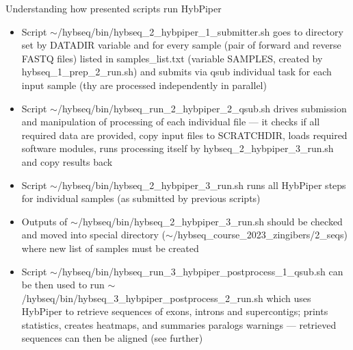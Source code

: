 \documentclass[compress,  xelatex, 11pt, xcolor=x11names, aspectratio=169,
	hyperref={
		bookmarks=true,
		unicode=true,
		colorlinks=true,
		pdftitle={HybSeq course},
		plainpages=false,
		pdfauthor={Vojtech Zeisek},
		pdfsubject={Practical processing of HybSeq target enrichment sequencing data on computing grids like MetaCentrum},
		pdfcreator={XeLaTeX},
		pdfkeywords={BASH, command line, GNU, HybSeq, Linux, MetaCentrum, sequencing shell, target enrichment},
		linkcolor=Turquoise4, %
		anchorcolor=DodgerBlue4, %
		citecolor=DodgerBlue4, %
		filecolor=DodgerBlue4, %
		menucolor=Tan4, %
		urlcolor=DarkOliveGreen4 %
		},
	url={hyphens, lowtilde} %
	]{beamer}
\renewcommand{\texttt}[1]{\colorbox{Cornsilk2}{{\ttfamily #1}}}
\begin{document}
\begin{frame}[allowframebreaks]{Understanding how presented scripts run HybPiper}
	\begin{itemize}
		\item Script \texttt{$\sim$/hybseq/bin/hybseq\_2\_hybpiper\_1\_submitter.sh} goes to directory set by \texttt{DATADIR} variable and for every sample (pair of forward and reverse FASTQ files) listed in \texttt{samples\_list.txt} (variable \texttt{SAMPLES}, created by \texttt{hybseq\_1\_prep\_2\_run.sh}) and submits via \texttt{qsub} individual task for each input sample (thy are processed independently in parallel)
		\item Script \texttt{$\sim$/hybseq/bin/hybseq\_run\_2\_hybpiper\_2\_qsub.sh} drives submission and manipulation of processing of each individual file --- it checks if all required data are provided, copy input files to \texttt{SCRATCHDIR}, loads required software modules, runs processing itself by \texttt{hybseq\_2\_hybpiper\_3\_run.sh} and copy results back
		\item Script \texttt{$\sim$/hybseq/bin/hybseq\_2\_hybpiper\_3\_run.sh} runs all HybPiper steps for individual samples (as submitted by previous scripts)
		\item Outputs of \texttt{$\sim$/hybseq/bin/hybseq\_2\_hybpiper\_3\_run.sh} should be checked and moved into special directory (\texttt{$\sim$/hybseq\_course\_2023\_zingibers/2\_seqs}) where new list of samples must be created
		\item Script \texttt{$\sim$/hybseq/bin/hybseq\_run\_3\_hybpiper\_postprocess\_1\_qsub.sh} can be then used to run \texttt{$\sim$/hybseq/bin/hybseq\_3\_hybpiper\_postprocess\_2\_run.sh} which uses HybPiper to retrieve sequences of exons, introns and supercontigs; prints statistics, creates heatmaps, and summaries paralogs warnings --- retrieved sequences can then be aligned (see further)
	\end{itemize}
\end{frame}
\end{document}
